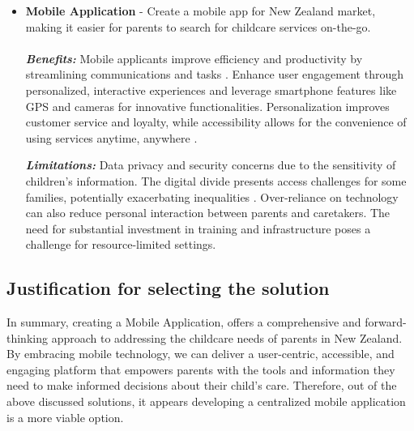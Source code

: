 \begin{itemize}
    \item \textbf{Mobile Application} - Create a mobile app for New Zealand market, making it easier for parents to search for childcare services on-the-go.\\ \\
    \emph{\textbf{Benefits:}} Mobile applicants improve efficiency and productivity by streamlining communications and tasks \cite{sarwar2013impact}. Enhance user engagement through personalized, interactive experiences and leverage smartphone features like GPS and cameras for innovative functionalities. Personalization improves customer service and loyalty, while accessibility allows for the convenience of using services anytime, anywhere \cite{shaikh2015mobile}.

    \emph{\textbf{Limitations:}} Data privacy and security concerns due to the sensitivity of children's information.\cite{privacyact2020} The digital divide presents access challenges for some families, potentially exacerbating inequalities \cite{di2020likely}. Over-reliance on technology can also reduce personal interaction between parents and caretakers. The need for substantial investment in training and infrastructure poses a challenge for resource-limited settings.
\end{itemize}


\subsection{Justification for selecting the solution}

In summary, creating a Mobile Application, offers a comprehensive and forward-thinking approach to addressing the childcare needs of parents in New Zealand. By embracing mobile technology, we can deliver a user-centric, accessible, and engaging platform that empowers parents with the tools and information they need to make informed decisions about their child's care. Therefore, out of the above discussed solutions, it appears developing a centralized mobile application is a more viable option. \par